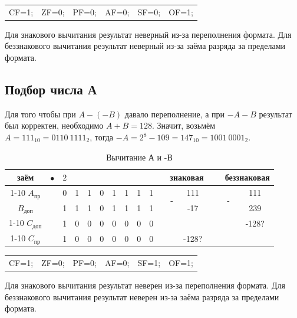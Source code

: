 \begin{table}[H]
    \centering
    \begin{tabular}{cccccc}
        CF=1; & ZF=0; & PF=0; & AF=0; & SF=0; & OF=1;
    \end{tabular}
\end{table}

Для знакового вычитания результат неверный из-за переполнения формата.
Для беззнакового вычитания результат неверный из-за заёма разряда за пределами формата. 

\subsection{Подбор числа А}
Для того чтобы при $A-(-B)$ давало переполнение, а при $-A-B$
результат был корректен, необходимо $A+B=128$. Значит, возьмём
$A=111_{10}=0110\ 1111_{2}$, тогда $-A=2^8-109=147_{10}=1001\ 0001_{2}$.

\begin{table}[H]
    \centering
    \caption{Вычитание А и -В}
    \begin{tabular}{c|cc|cccccccp{1cm}ccp{0.5cm}cc}
		\small заём & $\bullet$ & $2$ & & & & & & & & & \multicolumn{2}{c}{знаковая} & \  & \multicolumn{2}{c}{беззнаковая}  \\
		\cline{1-10} \cline{12-13} \cline{15-16}
		$A_{\text{пр}}$ & & 0 & 1 & 1 & 0 & 1 & 1 & 1 & 1 & & \multirow{2}{*}{-} & 111 & \  & \multirow{2}{*}{-} & 111   \\
		$B_{\text{доп}}$ & & 1 & 1 & 1 & 0 & 1 & 1 & 1 & 1 & & & -17 & \  &  & 239\\
		\cline{1-10} \cline{12-13} \cline{15-16}
		$C_{\text{доп}}$ & & 1 & 0 & 0 & 0 & 0 & 0 & 0 & 0 & & & & \  &  & -128? \\
		\cline{1-10} \cline{12-13} \cline{15-16}
		$C_{\text{пр}}$ & & 1 & 0 & 0 & 0 & 0 & 0 & 0 & 0 & & & -128? & \  &  & \\
    \end{tabular}
\end{table}

\begin{table}[H]
    \centering
    \begin{tabular}{cccccc}
        CF=1; & ZF=0; & PF=0; & AF=0; & SF=1; & OF=1;
    \end{tabular}
\end{table}

Для знакового вычитания результат неверен из-за переполнения формата.
Для беззнакового вычитания результат неверен из-за заёма разряда за пределами формата.

